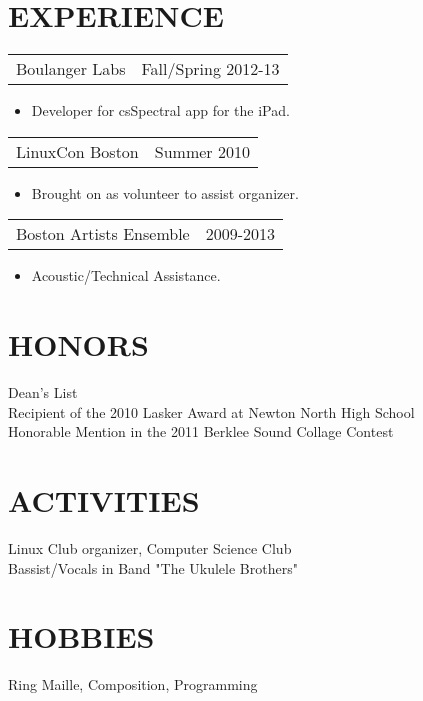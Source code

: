 \documentclass[margin]{res}
\begin{document}
\begin{resume}
\section{EXPERIENCE}      
                  \begin{tabular}{p{3in} r} %
                  Boulanger Labs &  Fall/Spring 2012-13
                  \end{tabular}	
                   \begin{itemize} %
                    \item[] Developer for csSpectral app for the iPad.
		   \end{itemize} 
		 \begin{tabular}{p{3in} r}
                  LinuxCon Boston &  Summer 2010
                 \end{tabular}	
		  \begin{itemize}
                   \item[] Brought on as volunteer to assist organizer.
                  \end{itemize}
                 \begin{tabular}{p{3in} r} %
                  Boston Artists Ensemble &  2009-2013
                 \end{tabular}
                  \begin{itemize}					        
                   \item[] Acoustic/Technical Assistance.
                  \end{itemize}
\section{HONORS} Dean's List \\
                 Recipient of the 2010 Lasker Award at Newton North High School\\
			  Honorable Mention in the 2011 Berklee Sound Collage Contest
 
\section{ACTIVITIES}
			 Linux Club organizer, Computer Science Club\\
			 Bassist/Vocals in Band "The Ukulele Brothers"
\section{HOBBIES}         Ring Maille, Composition, Programming
 
\end{resume} 
\end{document}
